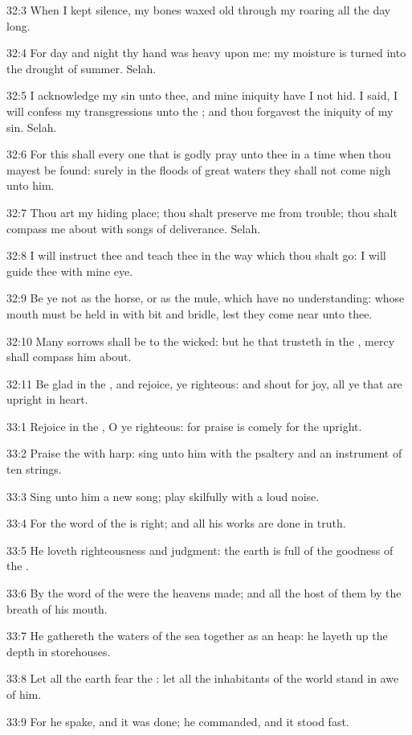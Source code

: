 32:3 When I kept silence, my bones waxed old through my roaring all
the day long.

32:4 For day and night thy hand was heavy upon me: my moisture is
turned into the drought of summer. Selah.

32:5 I acknowledge my sin unto thee, and mine iniquity have I not hid.
I said, I will confess my transgressions unto the \LORD; and thou
forgavest the iniquity of my sin. Selah.

32:6 For this shall every one that is godly pray unto thee in a time
when thou mayest be found: surely in the floods of great waters they
shall not come nigh unto him.

32:7 Thou art my hiding place; thou shalt preserve me from trouble;
thou shalt compass me about with songs of deliverance. Selah.

32:8 I will instruct thee and teach thee in the way which thou shalt
go: I will guide thee with mine eye.

32:9 Be ye not as the horse, or as the mule, which have no
understanding: whose mouth must be held in with bit and bridle, lest
they come near unto thee.

32:10 Many sorrows shall be to the wicked: but he that trusteth in the
\LORD, mercy shall compass him about.

32:11 Be glad in the \LORD, and rejoice, ye righteous: and shout for
joy, all ye that are upright in heart.



33:1 Rejoice in the \LORD, O ye righteous: for praise is comely for the
upright.

33:2 Praise the \LORD with harp: sing unto him with the psaltery and an
instrument of ten strings.

33:3 Sing unto him a new song; play skilfully with a loud noise.

33:4 For the word of the \LORD is right; and all his works are done in
truth.

33:5 He loveth righteousness and judgment: the earth is full of the
goodness of the \LORD.

33:6 By the word of the \LORD were the heavens made; and all the host
of them by the breath of his mouth.

33:7 He gathereth the waters of the sea together as an heap: he layeth
up the depth in storehouses.

33:8 Let all the earth fear the \LORD: let all the inhabitants of the
world stand in awe of him.

33:9 For he spake, and it was done; he commanded, and it stood fast.

